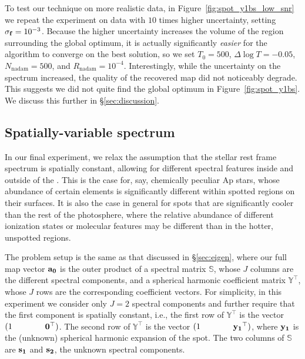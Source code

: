 \documentclass[modern]{aastex631}
\begin{document}
To test our technique on more realistic data, in Figure~\ref{fig:spot_y1bs_low_snr} we repeat the experiment on data with $10$ times higher uncertainty, setting $\sigma_{\mathbf{f}} = 10^{-3}$. 
Because the higher uncertainty increases the volume of the region surrounding the global optimum, it is actually significantly \emph{easier} for the algorithm to converge on the best solution, so we set $T_0 = 500$, $\Delta\log T = -0.05$, $N_\mathrm{nadam} = 500$, and $R_\mathrm{nadam} = 10^{-4}$. 
Interestingly, while the uncertainty on the spectrum increased, the quality of the recovered \spot map did not noticeably degrade. 
This suggests we did not quite find the global optimum in Figure~\ref{fig:spot_y1bs}. 
We discuss this further in \S\ref{sec:discussion}.

\subsection{Spatially-variable spectrum}
\label{sec:twospec}
%
In our final experiment, we relax the assumption that the stellar rest frame spectrum is spatially constant, allowing for different spectral features inside and outside of the \spot. 
This is the case for, say, chemically peculiar Ap stars, whose abundance of certain elements is significantly different within spotted regions on their surfaces. 
It is also the case in general for spots that are significantly cooler than the rest of the photosphere, where the relative abundance of different ionization states or molecular features may be different than in the hotter, unspotted regions.

The problem setup is the same as that discussed in \S\ref{sec:eigen}, where our full map vector ${\mathbf{a_0}}$ is the outer product of a spectral matrix $\mathbb{S}$, whose $J$ columns are the different spectral components, and a spherical harmonic coefficient matrix $\mathbb{Y}^\top$, whose $J$ rows are the corresponding coefficient vectors. 
For simplicity, in this experiment we consider only $J = 2$ spectral components and further require that the first component is spatially constant, i.e., the first row of $\mathbb{Y}^\top$ is the vector $(1 \quad\quad\quad\quad {\ensuremath{\mathbf{0}}}^\top)$. 
The second row of $\mathbb{Y}^\top$ is the vector $(1 \quad\quad\quad\quad {\ensuremath{\mathbf{y_1}}}^\top)$, where ${\mathbf{y_1}}$ is the (unknown) spherical harmonic expansion of the spot. 
The two columns of $\mathbb{S}$ are ${\mathbf{s_1}}$ and ${\mathbf{s_2}}$, the unknown spectral components.
\end{document}
